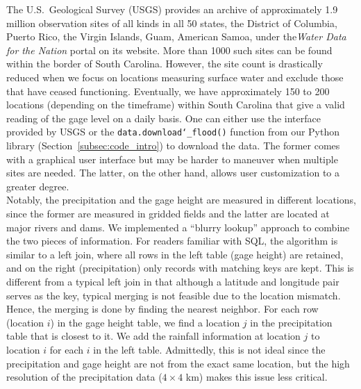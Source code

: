 \documentclass{svjour3}
\begin{document}
The U.S.\ Geological Survey (USGS) provides an archive of approximately 1.9 million observation sites of all kinds in all 50 states,  the District of Columbia, Puerto Rico, the Virgin Islands, Guam, American Samoa, under the\emph{Water Data for the Nation} portal on its website.
More than 1000 such sites can be found within the border of South Carolina.
However, the site count is drastically reduced when we focus on locations measuring surface water and exclude those that have ceased functioning.
Eventually, we have approximately 150 to 200 locations (depending on the timeframe) within South Carolina that give a valid reading of the gage level on a daily basis.
One can either use the interface provided by USGS or the \texttt{data.download\char`\_flood()} function from our Python library (Section~\ref{subsec:code_intro}) to download the data.
The former comes with a graphical user interface but may be harder to maneuver when multiple sites are needed.
The latter, on the other hand, allows user customization to a greater degree. \\

Notably, the precipitation and the gage height are measured in different locations, since the former are measured  in gridded fields and the latter are located at major rivers and dams.
We implemented a ``blurry lookup''  approach to  combine the two pieces of information.
For readers familiar with SQL, the algorithm is similar to a left join, where all rows in the left table (gage height) are retained, and on the right (precipitation) only records with  matching keys are kept.
This is different from a typical left join in that although a latitude and longitude pair serves as the key, typical merging is not feasible due to the location mismatch.
Hence, the merging is done by finding  the nearest neighbor.
For each row (location $ i$) in the gage height table, we find a location $ j$ in the precipitation table that is closest to it.
We add the rainfall information at location $ j$ to location $ i$ for each $ i$ in the left table.
Admittedly, this is not ideal since the precipitation and gage height are not from the exact same location, but the high resolution of the precipitation data ($ 4 \times 4 $ km) makes this issue less critical.\\
\end{document}
